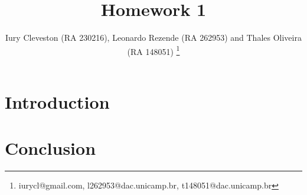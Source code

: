 \documentclass[]{IEEEtran}
\begin{document}
  \title{Homework 1}
  \author{Iury Cleveston (RA 230216), Leonardo Rezende (RA 262953) and Thales Oliveira (RA 148051)
    \thanks{iurycl@gmail.com, l262953@dac.unicamp.br, t148051@dac.unicamp.br}
  }

  \maketitle
  
  \begin{abstract}
  \end{abstract}
  
  \section{Introduction}

  
  
  \section{Conclusion}
  
\end{document}
